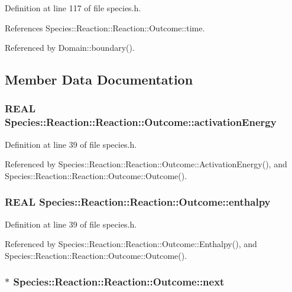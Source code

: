 Definition at line 117 of file species.h.

References Species::Reaction::Reaction::Outcome::time.

Referenced by Domain::boundary().

\subsection{Member Data Documentation}
\hypertarget{structSpecies_1_1Reaction_1_1Outcome_0508262e12d36ea36e1cd3c3c8f02a0b}{
\subsubsection[{activationEnergy}]{\setlength{\rightskip}{0pt plus 5cm}REAL Species::Reaction::Reaction::Outcome::activationEnergy}}
\label{structSpecies_1_1Reaction_1_1Outcome_0508262e12d36ea36e1cd3c3c8f02a0b}




Definition at line 39 of file species.h.

Referenced by Species::Reaction::Reaction::Outcome::ActivationEnergy(), and Species::Reaction::Reaction::Outcome::Outcome().\hypertarget{structSpecies_1_1Reaction_1_1Outcome_1b5db8fd0f9fa996a6c7624c83201141}{
\subsubsection[{enthalpy}]{\setlength{\rightskip}{0pt plus 5cm}REAL Species::Reaction::Reaction::Outcome::enthalpy}}
\label{structSpecies_1_1Reaction_1_1Outcome_1b5db8fd0f9fa996a6c7624c83201141}




Definition at line 39 of file species.h.

Referenced by Species::Reaction::Reaction::Outcome::Enthalpy(), and Species::Reaction::Reaction::Outcome::Outcome().\hypertarget{structSpecies_1_1Reaction_1_1Outcome_fc6cab6ededafb32e7fabd312a18bb0b}{
\subsubsection[{next}]{$\ast$ Species::Reaction::Reaction::Outcome::next}}
\label{structSpecies_1_1Reaction_1_1Outcome_fc6cab6ededafb32e7fabd312a18bb0b}


